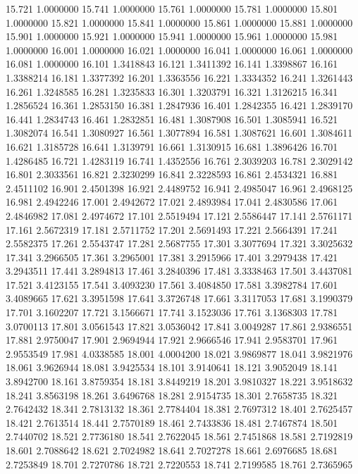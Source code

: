 15.721 1.0000000
15.741 1.0000000
15.761 1.0000000
15.781 1.0000000
15.801 1.0000000
15.821 1.0000000
15.841 1.0000000
15.861 1.0000000
15.881 1.0000000
15.901 1.0000000
15.921 1.0000000
15.941 1.0000000
15.961 1.0000000
15.981 1.0000000
16.001 1.0000000
16.021 1.0000000
16.041 1.0000000
16.061 1.0000000
16.081 1.0000000
16.101 1.3418843
16.121 1.3411392
16.141 1.3398867
16.161 1.3388214
16.181 1.3377392
16.201 1.3363556
16.221 1.3334352
16.241 1.3261443
16.261 1.3248585
16.281 1.3235833
16.301 1.3203791
16.321 1.3126215
16.341 1.2856524
16.361 1.2853150
16.381 1.2847936
16.401 1.2842355
16.421 1.2839170
16.441 1.2834743
16.461 1.2832851
16.481 1.3087908
16.501 1.3085941
16.521 1.3082074
16.541 1.3080927
16.561 1.3077894
16.581 1.3087621
16.601 1.3084611
16.621 1.3185728
16.641 1.3139791
16.661 1.3130915
16.681 1.3896426
16.701 1.4286485
16.721 1.4283119
16.741 1.4352556
16.761 2.3039203
16.781 2.3029142
16.801 2.3033561
16.821 2.3230299
16.841 2.3228593
16.861 2.4534321
16.881 2.4511102
16.901 2.4501398
16.921 2.4489752
16.941 2.4985047
16.961 2.4968125
16.981 2.4942246
17.001 2.4942672
17.021 2.4893984
17.041 2.4830586
17.061 2.4846982
17.081 2.4974672
17.101 2.5519494
17.121 2.5586447
17.141 2.5761171
17.161 2.5672319
17.181 2.5711752
17.201 2.5691493
17.221 2.5664391
17.241 2.5582375
17.261 2.5543747
17.281 2.5687755
17.301 3.3077694
17.321 3.3025632
17.341 3.2966505
17.361 3.2965001
17.381 3.2915966
17.401 3.2979438
17.421 3.2943511
17.441 3.2894813
17.461 3.2840396
17.481 3.3338463
17.501 3.4437081
17.521 3.4123155
17.541 3.4093230
17.561 3.4084850
17.581 3.3982784
17.601 3.4089665
17.621 3.3951598
17.641 3.3726748
17.661 3.3117053
17.681 3.1990379
17.701 3.1602207
17.721 3.1566671
17.741 3.1523036
17.761 3.1368303
17.781 3.0700113
17.801 3.0561543
17.821 3.0536042
17.841 3.0049287
17.861 2.9386551
17.881 2.9750047
17.901 2.9694944
17.921 2.9666546
17.941 2.9583701
17.961 2.9553549
17.981 4.0338585
18.001 4.0004200
18.021 3.9869877
18.041 3.9821976
18.061 3.9626944
18.081 3.9425534
18.101 3.9140641
18.121 3.9052049
18.141 3.8942700
18.161 3.8759354
18.181 3.8449219
18.201 3.9810327
18.221 3.9518632
18.241 3.8563198
18.261 3.6496768
18.281 2.9154735
18.301 2.7658735
18.321 2.7642432
18.341 2.7813132
18.361 2.7784404
18.381 2.7697312
18.401 2.7625457
18.421 2.7613514
18.441 2.7570189
18.461 2.7433836
18.481 2.7467874
18.501 2.7440702
18.521 2.7736180
18.541 2.7622045
18.561 2.7451868
18.581 2.7192819
18.601 2.7088642
18.621 2.7024982
18.641 2.7027278
18.661 2.6976685
18.681 2.7253849
18.701 2.7270786
18.721 2.7220553
18.741 2.7199585
18.761 2.7365965

